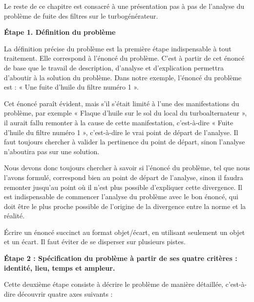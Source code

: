 Le reste de ce chapitre est consacré à une présentation pas à pas de l'analyse du problème de fuite des filtres sur le turbogénérateur.

\vspace{0.3cm}

\textbf{	Étape 1. Définition du problème}
\vspace{0.3cm}


La définition précise du problème est la première étape indispensable à tout traitement. Elle correspond à l’énoncé du problème. C’est à partir de cet énoncé de base que le travail de description, d’analyse et d’explication permettra d’aboutir à la solution du problème. Dans notre exemple, l’énoncé du problème est : « Une fuite d’huile du filtre numéro 1 ».
\vspace{0.3cm}

Cet énoncé paraît évident, mais s’il s’était limité à l’une des manifestations du problème, par exemple « Flaque d’huile sur le sol du local du turboalternateur », il aurait fallu remonter à la cause de cette manifestation, c’est-à-dire « Fuite d’huile du filtre numéro 1 », c’est-à-dire le vrai point de départ de l’analyse. Il faut toujours chercher à valider la pertinence du point de départ, sinon l’analyse n’aboutira pas sur une solution. 
\vspace{0.3cm}

Nous devons donc toujours chercher à savoir si l’énoncé du problème, tel que nous l’avons formulé, correspond bien au point de départ de l’analyse, sinon il faudra remonter jusqu’au point où il n’est plus possible d’expliquer cette divergence. Il est indispensable de commencer l’analyse du problème avec le bon énoncé, qui doit être le plus proche possible de l’origine de la divergence entre la norme et la réalité.
\vspace{0.3cm}


Écrire un énoncé succinct au format objet/écart, en utilisant seulement un objet et un écart. Il faut éviter de se disperser sur plusieurs pistes.


\vspace{0.3cm}

\textbf{Étape 2 : Spécification du problème à partir de ses quatre critères : 
identité, lieu, temps et ampleur.}

\vspace{0.3cm}

Cette deuxième étape consiste à décrire le problème de manière détaillée, c’est-à-dire découvrir quatre axes suivants :


